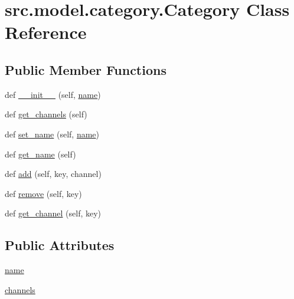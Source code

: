 \hypertarget{classsrc_1_1model_1_1category_1_1Category}{}\section{src.\+model.\+category.\+Category Class Reference}
\label{classsrc_1_1model_1_1category_1_1Category}
\subsection*{Public Member Functions}
\begin{DoxyCompactItemize}
\item 
def \hyperlink{classsrc_1_1model_1_1category_1_1Category_a42428a103608c2235a080796311229df}{\+\_\+\+\_\+init\+\_\+\+\_\+} (self, \hyperlink{classsrc_1_1model_1_1category_1_1Category_ac1f8913b5d11d768cb48cde2760f8322}{name})
\item 
def \hyperlink{classsrc_1_1model_1_1category_1_1Category_a9ab7071a70ec03d354867d45c2fc3430}{get\+\_\+channels} (self)
\item 
def \hyperlink{classsrc_1_1model_1_1category_1_1Category_a78262aabd6177a36f263b951622f8793}{set\+\_\+name} (self, \hyperlink{classsrc_1_1model_1_1category_1_1Category_ac1f8913b5d11d768cb48cde2760f8322}{name})
\item 
def \hyperlink{classsrc_1_1model_1_1category_1_1Category_abd572aca2e8c0366b8f9e501854631b0}{get\+\_\+name} (self)
\item 
def \hyperlink{classsrc_1_1model_1_1category_1_1Category_a76e9ca634460246d112f3c82e1049975}{add} (self, key, channel)
\item 
def \hyperlink{classsrc_1_1model_1_1category_1_1Category_a463fdbd98805904b49740915d541352f}{remove} (self, key)
\item 
def \hyperlink{classsrc_1_1model_1_1category_1_1Category_a93a44556d4e18dd423a167389f9b98ab}{get\+\_\+channel} (self, key)
\end{DoxyCompactItemize}
\subsection*{Public Attributes}
\begin{DoxyCompactItemize}
\item 
\hyperlink{classsrc_1_1model_1_1category_1_1Category_ac1f8913b5d11d768cb48cde2760f8322}{name}
\item 
\hyperlink{classsrc_1_1model_1_1category_1_1Category_af7b8a88e3eda96fa9bf9cb8c110800b3}{channels}
\end{DoxyCompactItemize}


